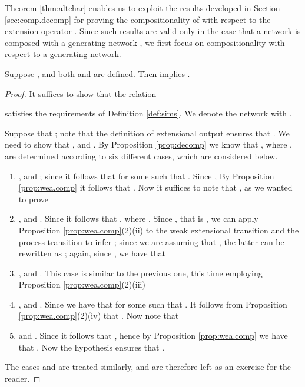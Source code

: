 \documentclass{LMCS}
\begin{document}
\noindent Theorem \ref{thm:altchar} enables us to exploit the results 
developed in Section \ref{sec:comp.decomp} for proving 
the compositionality of  with respect to the 
extension operator . Since such results are valid 
only in the case that a network  is composed
 with a generating network 
, we first focus on compositionality with respect 
to a generating network.

\begin{thm}\label{thm:single.comp}
  Suppose ,  
  and both  and 
 are defined. Then 
 implies 
.
\end{thm}

\begin{proof}
It suffices to show that the relation 

\noindent
satisfies the requirements of Definition \ref{def:sims}. 
We denote the network  with . 


Suppose that ; 
note that the definition of extensional output ensures that 
.
We need to show that , and . By 
Proposition \ref{prop:decomp} we know that 
, 
where ,  are determined according to 
six different cases, which are considered below.

\begin{enumerate}[label=(\roman*)]
\item ,  and 
; 
since  it follows that 
 for 
some  such that  
. Since 
, By Proposition 
\ref{prop:wea.comp} it follows that . 
Now it suffices to note that 
, 
as we wanted to prove
\item , 
 and .  
Since  it follows that 
, 
where . 
Since , that is  
, we can apply Proposition \ref{prop:wea.comp}(2)(ii)
to the weak extensional transition  and the process transition  
to infer ; since 
we are assuming that , the 
latter can be rewritten as  ; 
again, since , we have that 


\item , 
 and . This case is 
similar to the previous one, this time employing Proposition 
\ref{prop:wea.comp}(2)(iii)

\item ,  and 
. 
Since  we have that 
 for some  
such that . 
It follows from Proposition \ref{prop:wea.comp}(2)(iv) 
that . 
Now note that 

\item  and 
. Since  it follows that 
, hence by Proposition 
\ref{prop:wea.comp} we have that . 
Now the hypothesis  ensures that 
.


\end{enumerate}

\noindent The cases  and 
 are 
treated similarly, and are therefore left as an 
exercise for the reader.
\end{proof}
\end{document}
